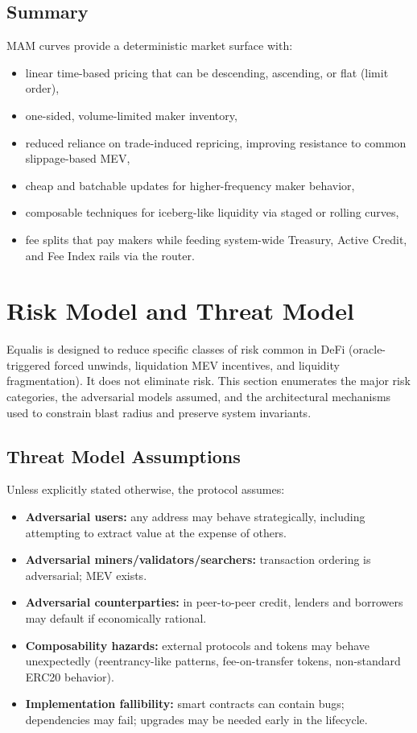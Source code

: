 \documentclass[version=preprint]{iacrcc}
\begin{document}
\subsection{Summary}

MAM curves provide a deterministic market surface with:
\begin{itemize}
  \item linear time-based pricing that can be descending, ascending, or flat (limit order),
  \item one-sided, volume-limited maker inventory,
  \item reduced reliance on trade-induced repricing, improving resistance to common slippage-based MEV,
  \item cheap and batchable updates for higher-frequency maker behavior,
  \item composable techniques for iceberg-like liquidity via staged or rolling curves,
  \item fee splits that pay makers while feeding system-wide Treasury, Active Credit, and Fee Index rails via the router.
\end{itemize}

\section{Risk Model and Threat Model}

Equalis is designed to reduce specific classes of risk common in DeFi (oracle-triggered forced unwinds, liquidation MEV incentives, and liquidity fragmentation). It does not eliminate risk. This section enumerates the major risk categories, the adversarial models assumed, and the architectural mechanisms used to constrain blast radius and preserve system invariants.

\subsection{Threat Model Assumptions}

Unless explicitly stated otherwise, the protocol assumes:
\begin{itemize}
  \item \textbf{Adversarial users:} any address may behave strategically, including attempting to extract value at the expense of others.
  \item \textbf{Adversarial miners/validators/searchers:} transaction ordering is adversarial; MEV exists.
  \item \textbf{Adversarial counterparties:} in peer-to-peer credit, lenders and borrowers may default if economically rational.
  \item \textbf{Composability hazards:} external protocols and tokens may behave unexpectedly (reentrancy-like patterns, fee-on-transfer tokens, non-standard ERC20 behavior).
  \item \textbf{Implementation fallibility:} smart contracts can contain bugs; dependencies may fail; upgrades may be needed early in the lifecycle.
\end{itemize}
\end{document}

